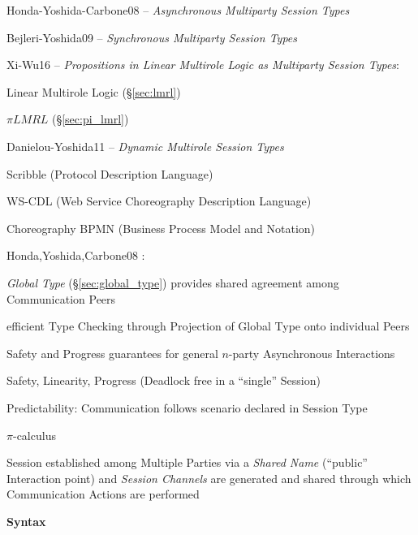 Honda-Yoshida-Carbone08 -- \emph{Asynchronous Multiparty Session
  Types} \cite{honda-yoshida-carbone08}

Bejleri-Yoshida09 -- \emph{Synchronous Multiparty Session Types}

Xi-Wu16 -- \emph{Propositions in Linear Multirole Logic as
  Multiparty Session Types}:

Linear Multirole Logic (\S\ref{sec:lmrl})

$\pi LMRL$ (\S\ref{sec:pi_lmrl})

Danielou-Yoshida11 -- \emph{Dynamic Multirole Session Types}

\fist Scribble (Protocol Description Language)

\fist WS-CDL (Web Service Choreography Description Language)

\fist Choreography BPMN (Business Process Model and Notation)


\asterism


Honda,Yoshida,Carbone08 \cite{honda-yoshida-carbone08}:

\emph{Global Type} (\S\ref{sec:global_type}) provides shared agreement among
Communication Peers

efficient Type Checking through Projection of Global Type onto
individual Peers

Safety and Progress guarantees for general $n$-party Asynchronous
Interactions

Safety, Linearity, Progress (Deadlock free in a ``single'' Session)

Predictability: Communication follows scenario declared in Session
Type

$\pi$-calculus

Session established among Multiple Parties via a \emph{Shared Name}
(``public'' Interaction point) and \emph{Session Channels} are
generated and shared through which Communication Actions are performed


\textbf{Syntax}

